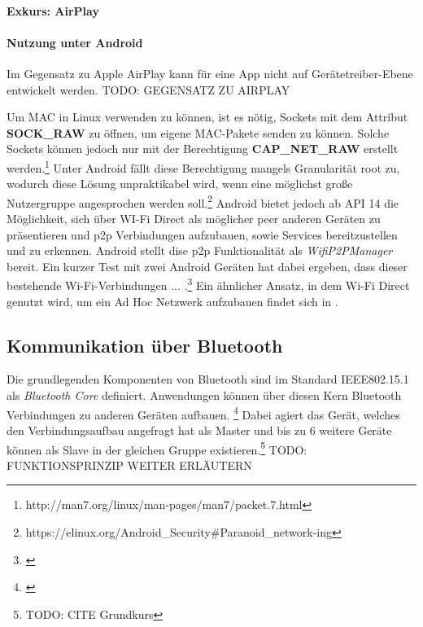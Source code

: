 \documentclass[12pt,a4paper]{article}
\begin{document}
            \paragraph{Exkurs: AirPlay}

        
            \paragraph{Nutzung unter Android}
            Im Gegensatz zu Apple AirPlay kann für eine App nicht auf Gerätetreiber-Ebene entwickelt werden. TODO: GEGENSATZ ZU AIRPLAY

            Um MAC in Linux verwenden zu können, ist es nötig, Sockets mit dem Attribut {\bf SOCK\_RAW} zu öffnen,
            um eigene MAC-Pakete senden zu können. Solche Sockets können jedoch nur mit der Berechtigung {\bf CAP\_NET\_RAW} erstellt werden.\footnote{http://man7.org/linux/man-pages/man7/packet.7.html}
            Unter Android fällt diese Berechtigung mangels Granularität root zu, wodurch diese Lösung unpraktikabel wird,
            wenn eine möglichst große Nutzergruppe angesprochen werden soll.\footnote{https://elinux.org/Android\_Security\#Paranoid\_network-ing}
            Android bietet jedoch ab API 14 die Möglichkeit, sich über WI-Fi Direct als möglicher peer anderen Geräten zu präsentieren und
            p2p Verbindungen aufzubauen, sowie Services bereitzustellen und zu erkennen.
            Android stellt dise p2p Funktionalität als {\it WifiP2PManager} bereit. Ein kurzer Test mit zwei Android Geräten hat dabei ergeben,
            dass dieser bestehende Wi-Fi-Verbindungen ... .\footnote{\cite{test-repository}}
            Ein ähnlicher Ansatz, in dem Wi-Fi Direct genutzt wird, um ein Ad Hoc Netzwerk aufzubauen findet sich in \cite{Aneja}.

        \subsection{Kommunikation über Bluetooth}
            Die grundlegenden Komponenten von Bluetooth sind im Standard IEEE802.15.1 als {\it Bluetooth Core} definiert. Anwendungen können über diesen Kern Bluetooth
            Verbindungen zu anderen Geräten aufbauen. \footnote{\cite[S.228]{Lueders}} Dabei agiert das Gerät, welches den Verbindungsaufbau angefragt hat als Master
            und bis zu 6 weitere Geräte können als Slave in der gleichen Gruppe existieren.\footnote{TODO: CITE Grundkurs}
            TODO: FUNKTIONSPRINZIP WEITER ERLÄUTERN
\end{document}
